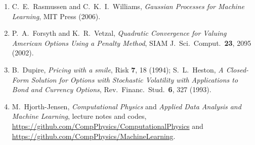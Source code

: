 \documentclass[12pt,a4paper]{article}
\begin{document}
\begin{enumerate}
    \item C.~E.~Rasmussen and C.~K.~I.~Williams, \textit{Gaussian Processes for Machine Learning}, MIT Press (2006).
    \item P.~A.~Forsyth and K.~R.~Vetzal, \textit{Quadratic Convergence for Valuing American Options Using a Penalty Method}, SIAM J.\ Sci.\ Comput.\ \textbf{23}, 2095 (2002).
    \item B.~Dupire, \textit{Pricing with a smile}, Risk \textbf{7}, 18 (1994); S.~L.~Heston, \textit{A Closed-Form Solution for Options with Stochastic Volatility with Applications to Bond and Currency Options}, Rev.\ Financ.\ Stud.\ \textbf{6}, 327 (1993).
    \item M.~Hjorth-Jensen, \textit{Computational Physics} and \textit{Applied Data Analysis and Machine Learning}, lecture notes and codes,\\ \url{https://github.com/CompPhysics/ComputationalPhysics} and\\ \url{https://github.com/CompPhysics/MachineLearning}.
\end{enumerate}
\end{document}
